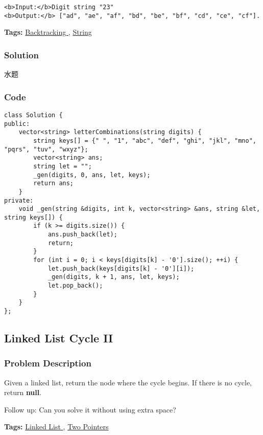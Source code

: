 \documentclass{article}
\begin{document}
\begin{CJK*}{UTF8}{gkai}
\begin{verbatim}
<b>Input:</b>Digit string "23"
<b>Output:</b> ["ad", "ae", "af", "bd", "be", "bf", "cd", "ce", "cf"].
\end{verbatim}

\textbf{Tags: }
\hyperref[ Backtracking ]{ Backtracking },  \hyperref[ String ]{ String }



\subsubsection*{Solution}
水题

\subsubsection*{Code}
\begin{lstlisting}
class Solution {
public:
    vector<string> letterCombinations(string digits) {
        string keys[] = {" ", "1", "abc", "def", "ghi", "jkl", "mno", "pqrs", "tuv", "wxyz"};
        vector<string> ans;
        string let = "";
        _gen(digits, 0, ans, let, keys);
        return ans;
    }
private:
    void _gen(string &digits, int k, vector<string> &ans, string &let, string keys[]) {
        if (k >= digits.size()) {
            ans.push_back(let);
            return;
        }
        for (int i = 0; i < keys[digits[k] - '0'].size(); ++i) {
            let.push_back(keys[digits[k] - '0'][i]);
            _gen(digits, k + 1, ans, let, keys);
            let.pop_back();
        }
    }
}; 
\end{lstlisting}


\subsection{ Linked List Cycle II }
\label{ Linked List Cycle II }

\subsubsection*{Problem Description}
Given a linked list, return the node where the cycle begins. If there is no cycle, return \textbf{null}.

Follow up:
Can you solve it without using extra space?


\textbf{Tags: }
\hyperref[ Linked List ]{ Linked List },  \hyperref[ Two Pointers ]{ Two Pointers }



\end{CJK*}
\end{document}
